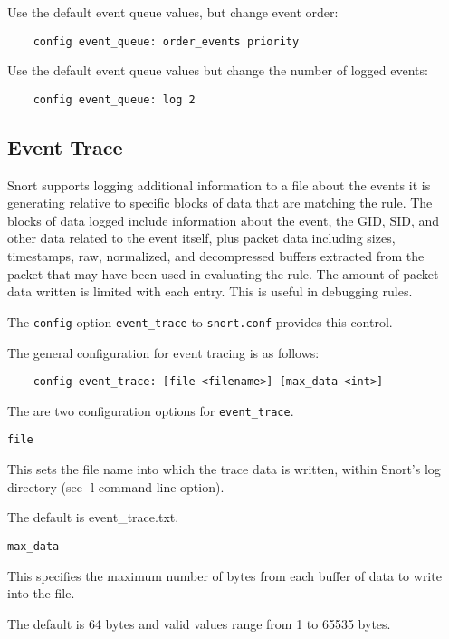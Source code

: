 \documentclass[english]{report}
\newcounter{slistnum}
\newenvironment{slist}
{ \begin{list}{ {\bf \arabic{slistnum}.} }{\usecounter{slistnum} } }
{ \end{list} }
\begin{document}
Use the default event queue values, but change event order:

\begin{verbatim}
    config event_queue: order_events priority
\end{verbatim}

Use the default event queue values but change the number of logged events:

\begin{verbatim}
    config event_queue: log 2
\end{verbatim}

\subsection{Event Trace}
\label{eventtrace}

Snort supports logging additional information to a file about the events it is
generating relative to specific blocks of data that are matching the rule.
The blocks of data logged include information about the event, the GID, SID,
and other data related to the event itself, plus packet data including sizes,
timestamps, raw, normalized, and decompressed buffers extracted from the packet
that may have been used in evaluating the rule.  The amount of packet data
written is limited with each entry.  This is useful in debugging rules.

The \texttt{config} option \texttt{event\_trace} to \texttt{snort.conf}
provides this control.

The general configuration for event tracing is as follows:

\begin{verbatim}
    config event_trace: [file <filename>] [max_data <int>]
\end{verbatim}

The are two configuration options for \texttt{event\_trace}.

\begin{slist}
\item \texttt{file}

This sets the file name into which the trace data is written, within
Snort's log directory (see -l command line option).

The default is event\_trace.txt.

\item \texttt{max\_data}

This specifies the maximum number of bytes from each buffer of data to write into
the file.

The default is 64 bytes and valid values range from 1 to 65535 bytes.

\end{slist}
\end{document}
